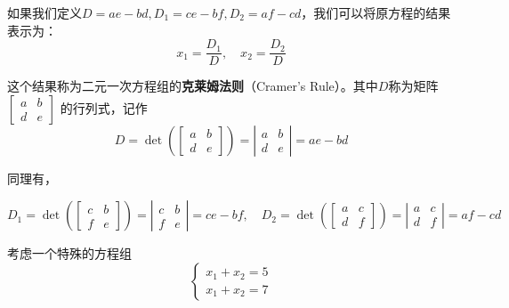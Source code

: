 如果我们定义$D=ae - bd, D_1=ce-bf, D_2=af - cd$，我们可以将原方程的结果表示为：
\begin{equation}
x_1 = \frac{D_1}{D},\quad x_2 = \frac{D_2}{D}
\end{equation}

这个结果称为二元一次方程组的\textcolor{third}{\bf 克莱姆法则}（Cramer's Rule）。其中$D$称为矩阵
$
\begin{bmatrix}
a & b \\
d & e
\end{bmatrix}
$
的行列式，记作
\begin{equation}
D = \operatorname*{det} \left(
    \begin{bmatrix}
        a & b \\
        d & e
        \end{bmatrix}
\right) = 
\left|
    \begin{array}{cc}
    a & b \\
    d & e
    \end{array}
\right|
= ae - bd
\end{equation}

同理有，

\begin{equation}
    D_1 = \operatorname*{det} \left(
        \begin{bmatrix}
            c & b \\
            f & e
            \end{bmatrix}
    \right) = 
    \left|
        \begin{array}{cc}
            c & b \\
            f & e
        \end{array}
    \right| = ce-bf, \quad
    D_2 = \operatorname*{det} \left(
        \begin{bmatrix}
            a & c \\
            d & f
            \end{bmatrix}
    \right) = 
    \left|
        \begin{array}{cc}
        a & c \\
        d & f
        \end{array}
    \right| = af - cd
\end{equation}

考虑一个特殊的方程组
\begin{equation}
    \left\{
        \begin{array}{l}
        x_1 + x_2 = 5\\
        x_1 + x_2 = 7
        \end{array}
        \right.
\end{equation}

